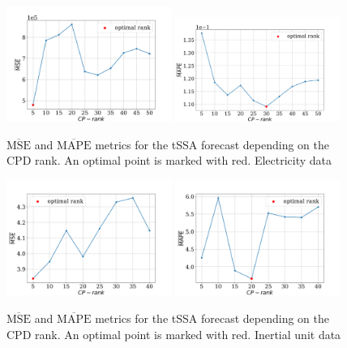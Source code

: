\documentclass[referee, pdflatex, sn-mathphys-num]{sn-jnl}
\theoremstyle{definition}
\theoremstyle{plain}
\begin{document}
	\begin{figure}[h]
		\centering
		\includegraphics[width=0.48\textwidth, keepaspectratio]{pred_MSE_rank_elec.png}
		\includegraphics[width=0.48\textwidth, keepaspectratio]{pred_MAPE_rank_elec.png}
		\caption{$ \overline{\text{MSE}} $ and $ \overline{\text{MAPE}} $ metrics for the tSSA forecast depending on the CPD rank. An optimal point is marked with red. Electricity data}\label{fig:mse_mape_electr}
	\end{figure}
	
	\begin{figure}[h]
		\centering
		\includegraphics[width=0.48\textwidth, keepaspectratio]{pred_MSE_rank_motion.png}
		\includegraphics[width=0.48\textwidth, keepaspectratio]{pred_MAPE_rank_motion.png}
		\caption{$ \overline{\text{MSE}} $ and $ \overline{\text{MAPE}} $ metrics for the tSSA forecast depending on the CPD rank. An optimal point is marked with red. Inertial unit data}\label{fig:mse_mape_motion}
	\end{figure}
	
\end{document}
